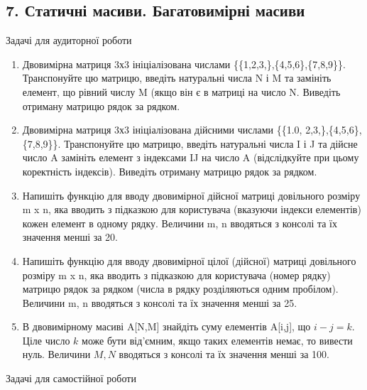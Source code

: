 \documentclass[]{article}
\makeatletter
\newcommand{\xslalph}[1]{\expandafter\@xslalph\csname c@#1\endcsname}
\newcommand{\@xslalph}[1]{%
    \ifcase#1\or а\or б\or в\or г\or д\or e\or є\or ж\or з\or i%
    \or й\or к\or л\or м\or н\or о\or п\or р\or с\or т%
    \or у\or ф\or х\or ц\or ч\or ш\or ю\or я\or аа\or бб\or вв%
    \else\@ctrerr\fi%
}
\makeatother
\begin{document}
\begin{enumerate}
\begin{enumerate}[label=\xslalph*)]
\begin{enumerate}
\begin{enumerate}[label=\xslalph*)]
\subsection{ 7. Статичні масиви. Багатовимірні масиви }
\setcounter{subsection}{1}

Задачі для аудиторної роботи

\begin{enumerate}
\def\labelenumi{\arabic{enumi})}
\item
  Двовимірна матриця 3х3 ініціалізована числами
  \{\{1,2,3,\},\{4,5,6\},\{7,8,9\}\}. Транспонуйте цю матрицю, введіть
  натуральні числа N і M та замініть елемент, що рівний числу M (якщо
  він є в матриці на число N. Виведіть отриману матрицю рядок за
  рядком.
\item
  Двовимірна матриця 3х3 ініціалізована дійсними числами \{\{1.0,
  2,3,\},\{4,5,6\},\{7,8,9\}\}. Транспонуйте цю матрицю, введіть
  натуральні числа I і J та дійсне число A замініть елемент з індексами
  IJ на число A (відслідкуйте при цьому коректність індексів). Виведіть
  отриману матрицю рядок за рядком.
\item
  Напишіть функцію для вводу двовимірної дійсної матриці довільного
  розміру m x n, яка вводить з підказкою для користувача (вказуючи
  індекси елементів) кожен елемент в одному рядку. Величини m, n
  вводяться з консолі та їх значення менші за 20.
\item
  Напишіть функцію для вводу двовимірної цілої (дійсної) матриці
  довільного розміру m x n, яка вводить з підказкою для користувача
  (номер рядку) матрицю рядок за рядком (числа в рядку розділяються
  одним пробілом). Величини m, n вводяться з консолі та їх значення
  менші за 25.
\item
  В двовимірному масиві A{[}N,M{]} знайдіть суму елементів A{[}i,j{]},
  що $i-j=k$. Ціле число $k$ може бути від'ємним, якщо таких елементів
  немає, то вивести нуль. Величини $M, N$ вводяться з консолі та їх
  значення менші за 100.
\end{enumerate}

Задачі для самостійної роботи


\end{enumerate}
\end{enumerate}
\end{enumerate}
\end{enumerate}
\end{document}
